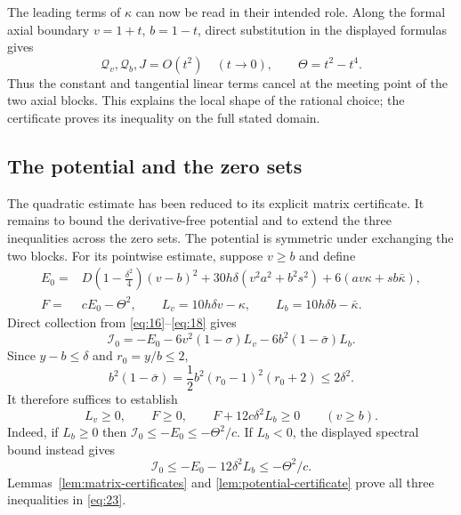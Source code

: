 The leading terms of $\kappa$ can now be read in their intended role.
Along the formal axial boundary $v=1+t$, $b=1-t$, direct substitution
in the displayed formulas gives
\[
 \mathcal Q_v,\mathcal Q_b,J=O(t^2)\quad(t\to0),
 \qquad \Theta=t^2-t^4.
\]
Thus the constant and tangential linear terms cancel at the meeting
point of the two axial blocks. This explains the local shape of the
rational choice; the certificate proves its inequality on the full
stated domain.

\subsection{The potential and the zero sets}

The quadratic estimate has been reduced to its explicit matrix certificate.
It remains to bound the derivative-free potential and to extend the
three inequalities across the zero sets. The potential is symmetric under exchanging the two blocks. For its
pointwise estimate, suppose $v\ge b$ and define
\[
\begin{aligned}
 E_0={}&D\left(1-\frac{\delta^2}{4}\right)(v-b)^2
       +30h\delta(v^2a^2+b^2s^2)
       +6(av\kappa+sb\bar\kappa),\\
 F={}&cE_0-\Theta^2,\qquad
 L_v=10h\delta v-\kappa,\qquad
 L_b=10h\delta b-\bar\kappa.
\end{aligned}
\]
Direct collection from \eqref{eq:16}--\eqref{eq:18} gives
\[
 \mathcal I_0=-E_0-6v^2(1-\sigma)L_v
                    -6b^2(1-\bar\sigma)L_b.
\]
Since $y-b\le\delta$ and $r_0=y/b\le2$,
\[
 b^2(1-\bar\sigma)
 =\frac12b^2(r_0-1)^2(r_0+2)\le2\delta^2.
\]
It therefore suffices to establish
\begin{equation}
 L_v\ge0,\qquad F\ge0,\qquad
 F+12c\delta^2L_b\ge0\qquad(v\ge b).
\tag{23}\label{eq:23}
\end{equation}
Indeed, if $L_b\ge0$ then $\mathcal I_0\le-E_0\le-\Theta^2/c$.
If $L_b<0$, the displayed spectral bound instead gives
\[
 \mathcal I_0\le-E_0-12\delta^2L_b\le-\Theta^2/c.
\]
Lemmas~\ref{lem:matrix-certificates} and
\ref{lem:potential-certificate} prove all three inequalities in
\eqref{eq:23}.

